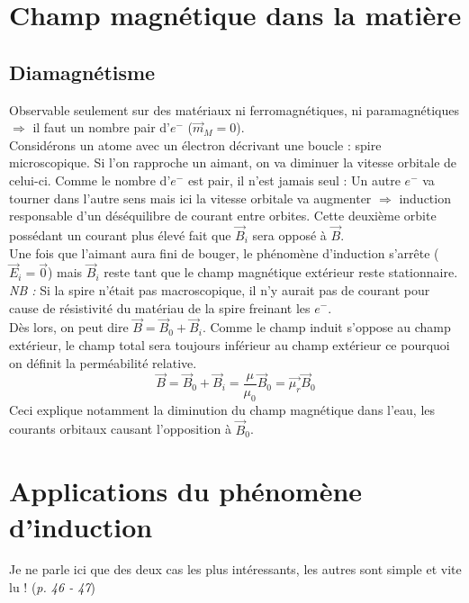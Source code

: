 \documentclass	[11pt, a4paper, openany]{book}
\begin{document}
\section{Champ magnétique dans la matière}
\subsection{Diamagnétisme}
Observable seulement sur des matériaux ni ferromagnétiques, ni paramagnétiques $\Rightarrow$ il faut un nombre pair d'$e^-$ ($\vec{m}_M = 0$).\\
Considérons un atome avec un électron décrivant une boucle : spire microscopique. Si l'on rapproche un aimant, on va diminuer la vitesse orbitale de celui-ci. Comme le nombre d'$e^-$ est pair, il n'est jamais seul : Un autre $e^-$ va tourner dans l'autre sens mais ici la vitesse orbitale va augmenter $\Rightarrow$ induction responsable d'un déséquilibre de courant entre orbites. Cette deuxième orbite possédant un courant plus élevé fait que $\vec{B}_i$ sera opposé à $\vec{B}$.\\

Une fois que l'aimant aura fini de bouger, le phénomène d'induction s'arrête ($\vec{E}_i = \vec{0}$) mais $\vec{B}_i$ reste tant que le champ magnétique extérieur reste stationnaire.\\

\textit{NB :} Si la spire n'était pas macroscopique, il  n'y aurait pas de courant pour cause de résistivité du matériau de la spire freinant les $e^-$.\\

Dès lors, on peut dire $\vec{B} = \vec{B}_0 + \vec{B}_i$. Comme le champ induit s'oppose au champ extérieur, le champ total sera toujours inférieur au champ extérieur ce pourquoi on définit la perméabilité relative.
\begin{equation}
\vec{B} = \vec{B}_0 + \vec{B}_i = \frac{\mu}{\mu_0}\vec{B}_0 = \vec{\mu_r}\vec{B}_0
\end{equation}
Ceci explique notamment la diminution du champ magnétique dans l'eau, les courants orbitaux causant l'opposition à $\vec{B}_0$.

\section{Applications du phénomène d'induction}
Je ne parle ici que des deux cas les plus intéressants, les autres sont simple et vite lu ! (\textit{p. 46 - 47})
\end{document}
